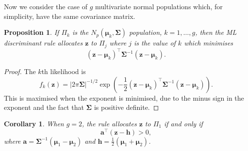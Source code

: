\documentclass[]{book}
\newtheorem{corollary}{Corollary}[chapter]
\newtheorem{proposition}{Proposition}[chapter]
\theoremstyle{definition}
\theoremstyle{definition}
\theoremstyle{definition}
\theoremstyle{remark}
\begin{document}
Now we consider the case of \(g\) multivariate normal populations which, for simplicity, have the same covariance matrix.

\begin{proposition}
\protect\hypertarget{prp:nine1}{}{\label{prp:nine1} }If \(\Pi_k\) is the \(N_p(\boldsymbol \mu_k,\boldsymbol \Sigma)\) population, \(k=1,\ldots,g\), then the ML discriminant rule allocates \(\boldsymbol z\) to \(\Pi_j\) where \(j\) is the value of \(k\) which minimises
\[(\boldsymbol z-\boldsymbol \mu_k)^\top \boldsymbol \Sigma^{-1} (\boldsymbol z-\boldsymbol \mu_k).\]
\end{proposition}

\begin{proof}
{} The \(k\)th likelihood is
\[f_k(\boldsymbol z) = | 2 \pi \boldsymbol \Sigma|^{-1/2} \exp \left(-\frac{1}{2} (\boldsymbol z- \boldsymbol \mu_k)^\top \boldsymbol \Sigma^{-1} (\boldsymbol z- \boldsymbol \mu_k) \right).\]
This is maximised when the exponent is minimised, due to the minus sign in the exponent and the fact that \(\boldsymbol \Sigma\) is positive definite.
\end{proof}

\begin{corollary}
\protect\hypertarget{cor:nine2c}{}{\label{cor:nine2c} }When \(g=2\), the rule allocates \(\boldsymbol z\) to \(\Pi_1\) if and only if
\[\boldsymbol a^\top (\boldsymbol z- \boldsymbol h) > 0, \]
where \(\boldsymbol a= \boldsymbol \Sigma^{-1} (\boldsymbol \mu_1 - \boldsymbol \mu_2)\) and \(\boldsymbol h= \frac{1}{2} (\boldsymbol \mu_1 + \boldsymbol \mu_2)\).
\end{corollary}
\end{document}
